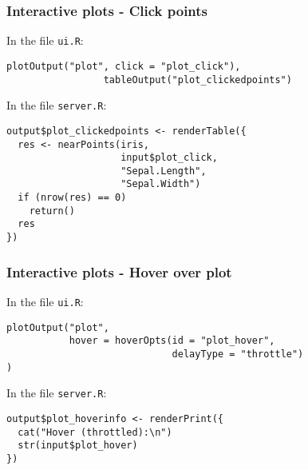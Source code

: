 \documentclass{beamer}
\begin{document}
	\begin{frame}[fragile]
		\frametitle{Interactive plots - Click points}

		In the file \verb|ui.R|:
		
		\begin{exampleblock}{}
		\begin{BVerbatim}
plotOutput("plot", click = "plot_click"),
                 tableOutput("plot_clickedpoints")
		\end{BVerbatim}
		\end{exampleblock}{}

		\vspace{1em}

		In the file \verb|server.R|:
		
		\begin{exampleblock}{}
		\begin{BVerbatim}
output$plot_clickedpoints <- renderTable({
  res <- nearPoints(iris,
                    input$plot_click,
                    "Sepal.Length",
                    "Sepal.Width")
  if (nrow(res) == 0)
    return()
  res
})
		\end{BVerbatim}
		\end{exampleblock}{}

	\end{frame}

	\begin{frame}[fragile]
		\frametitle{Interactive plots - Hover over plot}

		In the file \verb|ui.R|:
		
		\begin{exampleblock}{}
		\begin{BVerbatim}
plotOutput("plot",
           hover = hoverOpts(id = "plot_hover",
                             delayType = "throttle")
)
		\end{BVerbatim}
		\end{exampleblock}{}

		\vspace{1em}

		In the file \verb|server.R|:
		
		\begin{exampleblock}{}
		\begin{BVerbatim}
output$plot_hoverinfo <- renderPrint({
  cat("Hover (throttled):\n")
  str(input$plot_hover)
})  
		\end{BVerbatim}
		\end{exampleblock}{}

	\end{frame}
\end{document}
